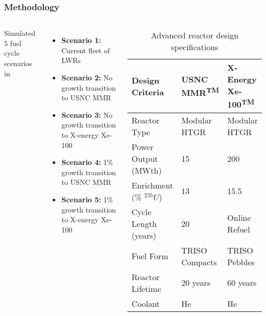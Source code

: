 \begin{frame}
    \frametitle{Methodology}
    \begin{columns}
        \column[t]{5cm}
        Simulated 5 fuel cycle scenarios in \Cyclus \cite{huff_fundamental_2016}
    \begin{itemize}
        \item \textbf{Scenario 1:} Current fleet of \glspl{LWR}
        \item \textbf{Scenario 2:} No growth transition to \gls{USNC} \gls{MMR}
        \item \textbf{Scenario 3:} No growth transition to X-energy Xe-100
        \item \textbf{Scenario 4:} 1\% growth transition to \gls{USNC} \gls{MMR}
        \item \textbf{Scenario 5:} 1\% growth transition to X-energy Xe-100
    \end{itemize}

    \column[t]{5cm}
    \begingroup
        \renewcommand{\arraystretch}{1.5} %
        \begin{table}[t!]
            \tiny
            \caption{Advanced reactor design specifications}
            \label{tab:reactor_summary}
            \begin{tabular}{ p{1.5cm} p{1.5cm} p{1.25cm}}
                \hline
                Design Criteria & \gls{USNC} \gls{MMR}\textsuperscript{TM} & 
                    X-Energy Xe-100\textsuperscript{TM} \\\hline
                
                Reactor Type & Modular HTGR & Modular HTGR \\
                Power Output (MWth) & 15 & 200 \\
                Enrichment (\% $^{235}U$) & 13 & 15.5 \\
                Cycle Length (years) & 20 & Online Refuel\\
                Fuel Form & TRISO Compacts & TRISO Pebbles\\
                Reactor Lifetime & 20 years & 60 years \\
                Coolant & He & He \\
                \hline
            \end{tabular}
        \end{table}   
        \endgroup
    \end{columns}
\end{frame}

